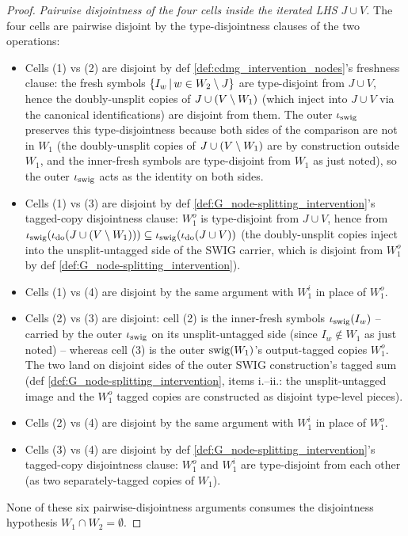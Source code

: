 \documentclass[main]{subfiles}
\begin{document}
\begin{proof}
\smallskip\noindent\emph{Pairwise disjointness of the four cells inside the iterated LHS $J \cup V$.}
The four cells are pairwise disjoint by the type-disjointness clauses of the two operations:
\begin{itemize}
    \item Cells (1) vs (2) are disjoint by def \ref{def:cdmg_intervention_nodes}'s freshness clause: the fresh symbols $\left \{ I_w \,\middle|\, w \in W_2 \setminus J \right \}$ are type-disjoint from $J \cup V$, hence the doubly-unsplit copies of $J \cup (V \setminus W_1)$ (which inject into $J \cup V$ via the canonical identifications) are disjoint from them. The outer $\iota_{\mathrm{swig}}$ preserves this type-disjointness because both sides of the comparison are not in $W_1$ (the doubly-unsplit copies of $J \cup (V \setminus W_1)$ are by construction outside $W_1$, and the inner-fresh symbols are type-disjoint from $W_1$ as just noted), so the outer $\iota_{\mathrm{swig}}$ acts as the identity on both sides.
    \item Cells (1) vs (3) are disjoint by def \ref{def:G_node-splitting_intervention}'s tagged-copy disjointness clause: $W_1^o$ is type-disjoint from $J \cup V$, hence from $\iota_{\mathrm{swig}}(\iota_{\operatorname{do}}(J \cup (V \setminus W_1))) \subseteq \iota_{\mathrm{swig}}(\iota_{\operatorname{do}}(J \cup V))$ (the doubly-unsplit copies inject into the unsplit-untagged side of the SWIG carrier, which is disjoint from $W_1^o$ by def \ref{def:G_node-splitting_intervention}).
    \item Cells (1) vs (4) are disjoint by the same argument with $W_1^i$ in place of $W_1^o$.
    \item Cells (2) vs (3) are disjoint: cell (2) is the inner-fresh symbols $\iota_{\mathrm{swig}}(I_w)$ -- carried by the outer $\iota_{\mathrm{swig}}$ on its unsplit-untagged side (since $I_w \notin W_1$ as just noted) -- whereas cell (3) is the outer $\mathrm{swig}(W_1)$'s output-tagged copies $W_1^o$. The two land on disjoint sides of the outer SWIG construction's tagged sum (def \ref{def:G_node-splitting_intervention}, items i.--ii.: the unsplit-untagged image and the $W_1^o$ tagged copies are constructed as disjoint type-level pieces).
    \item Cells (2) vs (4) are disjoint by the same argument with $W_1^i$ in place of $W_1^o$.
    \item Cells (3) vs (4) are disjoint by def \ref{def:G_node-splitting_intervention}'s tagged-copy disjointness clause: $W_1^o$ and $W_1^i$ are type-disjoint from each other (as two separately-tagged copies of $W_1$).
\end{itemize}
None of these six pairwise-disjointness arguments consumes the disjointness hypothesis $W_1 \cap W_2 = \emptyset$.


\end{proof}
\end{document}
